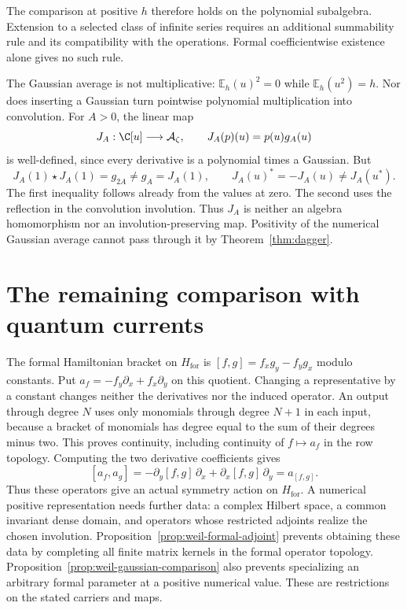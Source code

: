 The comparison at positive $h$ therefore holds on the polynomial
subalgebra.  Extension to a selected class of infinite series requires
an additional summability rule and its compatibility with the operations.
Formal coefficientwise existence alone gives no such rule.

The Gaussian average is not multiplicative:
$\mathbb E_h(u)^2=0$ while $\mathbb E_h(u^2)=h$.
Nor does inserting a Gaussian turn pointwise polynomial multiplication
into convolution.  For $A>0$, the linear map
\[
 J_A:\C[u]\longrightarrow\A_\zeta,\qquad J_A(p)(u)=p(u)g_A(u)
\]
is well-defined, since every derivative is a polynomial times a Gaussian.
But
\[
 J_A(1)\star J_A(1)=g_{2A}\ne g_A=J_A(1),
 \qquad J_A(u)^*=-J_A(u)\ne J_A(u^*).
\]
The first inequality follows already from the values at zero.
The second uses the reflection in the convolution involution.
Thus $J_A$ is neither an algebra homomorphism nor an involution-preserving
map.  Positivity of the numerical Gaussian average cannot pass through
it by Theorem~\ref{thm:dagger}.

\section{The remaining comparison with quantum currents}
\label{sec:weil-current-comparison}

The formal Hamiltonian bracket on $H_{\mathrm{for}}$ is
$[f,g]=f_xg_y-f_yg_x$ modulo constants.
Put $a_f=-f_y\partial_x+f_x\partial_y$ on this quotient.
Changing a representative by a constant changes neither the derivatives
nor the induced operator.  An output through degree $N$ uses only
monomials through degree $N+1$ in each input, because a bracket of
monomials has degree equal to the sum of their degrees minus two.
This proves continuity, including continuity of $f\mapsto a_f$ in the
row topology.  Computing the two derivative coefficients gives
\[
 [a_f,a_g]=-\partial_y[f,g]\,\partial_x
                 +\partial_x[f,g]\,\partial_y=a_{[f,g]}.
\]
Thus these operators give an actual symmetry action on $H_{\mathrm{for}}$.
A numerical positive representation needs further data: a complex
Hilbert space, a common invariant dense domain, and
operators whose restricted adjoints realize the chosen involution.
Proposition~\ref{prop:weil-formal-adjoint} prevents obtaining these data
by completing all finite matrix kernels in the formal operator topology.
Proposition~\ref{prop:weil-gaussian-comparison} also prevents specializing
an arbitrary formal parameter at a positive numerical value.
These are restrictions on the stated carriers and maps.

